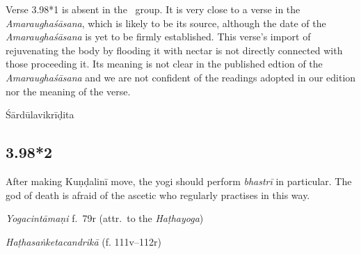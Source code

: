 \begin{ekdosis}
\begin{testimonia}[hp03_098_1]
\end{testimonia}

\begin{philcomm}[hp03_098_1]
Verse 3.98*1 is absent in the \textalpha\ group. It is very close to a verse in the \textit{Amaraughaśāsana}, which is likely to be its source, although the date of the \textit{Amaraughaśāsana} is yet to be firmly established. This verse's import of rejuvenating the body by flooding it with nectar is not directly connected with those proceeding it. Its meaning is not clear in the published edtion of the \textit{Amaraughaśāsana} and we are not confident of the readings adopted in our edition nor the meaning of the verse.

\end{philcomm}

\begin{metre}[hp03_098_1]
Śārdūlavikrīḍita
\end{metre}

\subsection*{3.98*2}
\begin{translation}[hp03_098_2]
After making Kuṇḍalinī move, the yogi should perform \emph{bhastrī} in particular. The god of death is afraid of the ascetic who regularly practises in this way.
\end{translation}


\begin{testimonia}[hp03_098_2]
\emph{Yogacintāmaṇi} f.~79r (attr.~to the \emph{Haṭhayoga})
\begin{versinnote}
\end{versinnote}

\emph{Haṭhasaṅketacandrikā} (f. 111v–112r)
\begin{versinnote}
\end{versinnote}
\end{testimonia}


\end{ekdosis}
